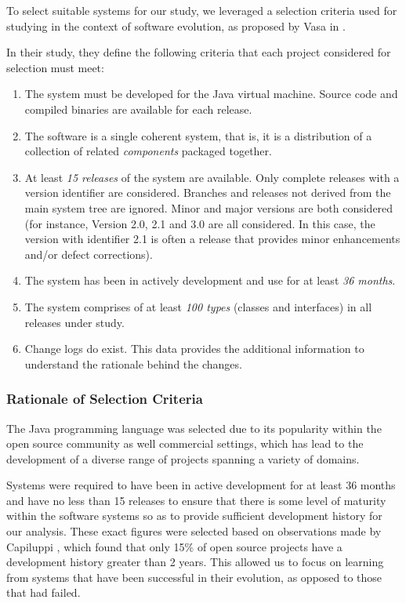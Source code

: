 To select suitable systems for our study, we leveraged a selection criteria used for studying \OSYS in the context of software evolution, as proposed by Vasa in \cite{Vasa10a}.

In their study, they define the following criteria that each project considered for selection must meet:

\begin{enumerate}
	\item The system must be developed for the Java virtual machine. Source code and compiled binaries are available for each release.
	\item The software is a single coherent system, that is, it is a distribution of a collection of related {\em components} packaged together.
	\item At least {\em 15 releases} of the system are available. Only complete releases with a version identifier are considered. Branches and releases not derived from the main system tree are ignored.  Minor and major versions are both considered (for instance, Version 2.0, 2.1 and 3.0 are all considered. In this case, the version with identifier 2.1 is often a release that provides minor enhancements and/or defect corrections).
	\item The system has been in actively development and use for at least \emph{36 months}.
	\item The system comprises of at least \emph{100 types} (\ie classes and interfaces) in all releases under study.
	\item Change logs do exist. This data provides the additional information to understand the rationale behind the changes.
\end{enumerate}

\subsubsection{Rationale of Selection Criteria} %
\label{ssub:rationale_of_selection_criteria}

The Java programming language was selected due to its popularity within the open source community as well commercial settings, which has lead to the development of a diverse range of projects spanning a variety of domains. 

Systems were required to have been in active development for at least 36 months and have no less than 15 releases to ensure that there is some level of maturity within the software systems so as to provide sufficient development history for our analysis. These exact figures were selected based on observations made by Capiluppi \cite{Capiluppi03a}, which found that only 15\% of open source projects have a development history greater than 2 years. This allowed us to focus on learning from systems that have been successful in their evolution, as opposed to those that had failed.

